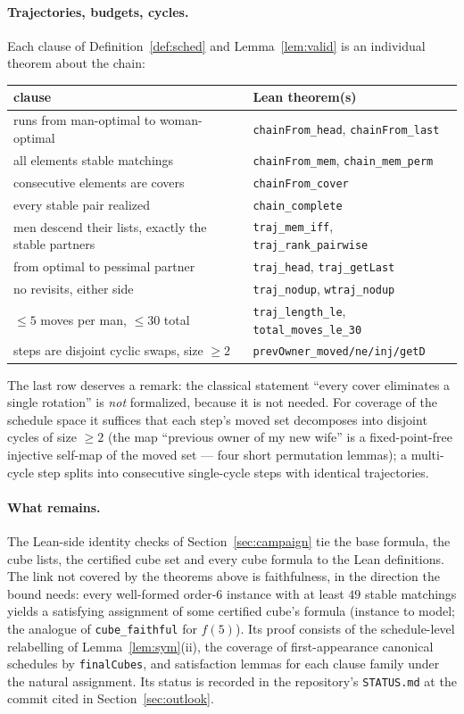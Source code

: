 \documentclass[11pt]{article}
\begin{document}
\paragraph{Trajectories, budgets, cycles.} Each clause of
Definition~\ref{def:sched} and Lemma~\ref{lem:valid} is an individual theorem about
the chain:
\begin{center}\small
\begin{tabular}{ll}
\toprule
clause & Lean theorem(s)\\
\midrule
runs from man-optimal to woman-optimal & \texttt{chainFrom\_head}, \texttt{chainFrom\_last}\\
all elements stable matchings & \texttt{chainFrom\_mem}, \texttt{chain\_mem\_perm}\\
consecutive elements are covers & \texttt{chainFrom\_cover}\\
every stable pair realized & \texttt{chain\_complete}\\
men descend their lists, exactly the stable partners & \texttt{traj\_mem\_iff}, \texttt{traj\_rank\_pairwise}\\
from optimal to pessimal partner & \texttt{traj\_head}, \texttt{traj\_getLast}\\
no revisits, either side & \texttt{traj\_nodup}, \texttt{wtraj\_nodup}\\
$\le 5$ moves per man, $\le 30$ total & \texttt{traj\_length\_le}, \texttt{total\_moves\_le\_30}\\
steps are disjoint cyclic swaps, size $\ge 2$ & \texttt{prevOwner\_moved/ne/inj/getD}\\
\bottomrule
\end{tabular}
\end{center}
The last row deserves a remark: the classical statement ``every cover eliminates a
single rotation'' is \emph{not} formalized, because it is not needed. For coverage
of the schedule space it suffices that each step's moved set decomposes into
disjoint cycles of size $\ge 2$ (the map ``previous owner of my new wife'' is a
fixed-point-free injective self-map of the moved set --- four short permutation
lemmas); a multi-cycle step splits into consecutive single-cycle steps with
identical trajectories.

\paragraph{What remains.} The Lean-side identity checks of Section~\ref{sec:campaign} tie
the base formula, the cube lists, the certified cube set and every cube formula to the Lean
definitions. The link not covered by the theorems above is faithfulness, in the direction the
bound needs: every well-formed order-6 instance with at least $49$ stable matchings yields a
satisfying assignment of some certified cube's formula (instance to model; the analogue of
\texttt{cube\_faithful} for $f(5)$). Its proof consists of the schedule-level relabelling of
Lemma~\ref{lem:sym}(ii), the coverage of first-appearance canonical schedules by
\texttt{finalCubes}, and satisfaction lemmas for each clause family under the natural assignment.
Its status is recorded in the repository's \texttt{STATUS.md} at the commit cited in
Section~\ref{sec:outlook}.
\end{document}
